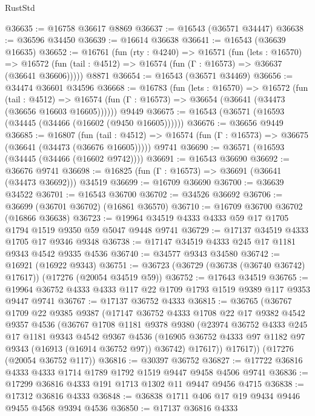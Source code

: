 \begin{lexlean}{RustStd}
\begin{coremodule}
@36635 := @16758 @36617 @8869
@36637 := @16543 (@36571 @34447)
@36638 := @36596 @34450
@36639 := @16614 @36638
@36641 := @16543 (@36639 @16635)
@36652 := @16761
    (fun (rty : @4240) =>
    @16571
      (fun (lets : @16570) =>
      @16572 (fun (tail : @4512) => @16574 (fun (Γ : @16573) => @36637 (@36641 @36606)))))
    @8871
@36654 := @16543 (@36571 @34469)
@36656 := @34474 @36601 @34596
@36668 := @16783
    (fun (lets : @16570) =>
    @16572
      (fun (tail : @4512) =>
      @16574 (fun (Γ : @16573) => @36654 (@36641 (@34473 (@36656 @16603 @16605))))))
    @9449
@36675 := @16543 (@36571 (@16593 (@34445 (@34466 (@16602 (@9450 @16605))))))
@36676 := @36656 @9449
@36685 := @16807
    (fun (tail : @4512) => @16574 (fun (Γ : @16573) => @36675 (@36641 (@34473 (@36676 @16605)))))
    @9741
@36690 := @36571 (@16593 (@34445 (@34466 (@16602 @9742))))
@36691 := @16543 @36690
@36692 := @36676 @9741
@36698 := @16825 (fun (Γ : @16573) => @36691 (@36641 (@34473 @36692))) @34519
@36699 := @16709 @36690
@36700 := @36639 @34522
@36701 := @16543 @36700
@36702 := @34526 @36692
@36706 := @36699 (@36701 @36702) (@16861 @36570)
@36710 := @16709 @36700 @36702 (@16866 @36638)
@36723 := @19964 @34519 @4333 @4333 @59 @17 @1705 @1794 @1519 @9350 @59 @5047 @9448 @9741
@36729 := @17137 @34519 @4333 @1705 @17 @9346 @9348
@36738 := @17147 @34519 @4333 @245 @17 @1181 @9343 @4542 @9335 @4536
@36740 := @34577 @9343 @34580
@36742 := @16921 (@16922 @9343)
@36751 := @36723 (@36729 (@36738 (@36740 @36742) @17617)) (@17276 (@20054 @34519 @59))
@36752 := @17643 @34519
@36765 := @19964 @36752 @4333 @4333 @117 @22 @1709 @1793 @1519 @9389 @117 @9353 @9447 @9741
@36767 := @17137 @36752 @4333
@36815 := @36765
    (@36767
      @1709
      @22
      @9385
      @9387
      (@17147
        @36752
        @4333
        @1708
        @22
        @17
        @9382
        @4542
        @9357
        @4536
        (@36767
          @1708
          @1181
          @9378
          @9380
          (@23974
            @36752
            @4333
            @245
            @17
            @1181
            @9343
            @4542
            @9367
            @4536
            (@16905 @36752 @4333 @97 @1182 @97 @9343 (@16913 (@16914 @36752 @97)) @36742)
            @17617))
        @17617))
    (@17276 (@20054 @36752 @117))
@36816 := @30397 @36752
@36827 := @17722 @36816 @4333 @4333 @1714 @1789 @1792 @1519 @9447 @9458 @4506 @9741
@36836 := @17299 @36816 @4333 @191 @1713 @1302 @11 @9447 @9456 @4715
@36838 := @17312 @36816 @4333
@36848 := @36838 @1711 @406 @17 @19 @9434 @9446 @9455 @4568 @9394 @4536
@36850 := @17137 @36816 @4333

\end{coremodule}
\end{lexlean}
